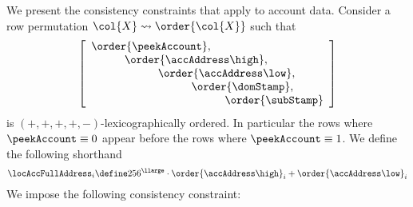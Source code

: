 We present the consistency constraints that apply to account data.
Consider a row permutation $\col{X} \rightsquigarrow \order{\col{X}}$ such that
\[
	\left[\begin{array}{l}
		\order{\peekAccount}, \\
		\quad\quad\quad \order{\accAddress\high}, \\
		\quad\quad\quad \quad\quad\quad \order{\accAddress\low}, \\
		\quad\quad\quad \quad\quad\quad \quad\quad\quad \order{\domStamp}, \\
		\quad\quad\quad \quad\quad\quad \quad\quad\quad \quad\quad\quad\order{\subStamp} \\
	\end{array}\right]
\]
\noindent is $(+, +, +, +, -)$-lexicographically ordered.
In particular the rows where $\peekAccount \equiv 0$ appear before the rows where $\peekAccount \equiv 1$.
We define the following shorthand
\[
	\locAccFullAddress_{i}
	\define
	256^\llarge \cdot \order{\accAddress\high}_{i} + \order{\accAddress\low}_{i}
\]
We impose the following consistency constraint:
